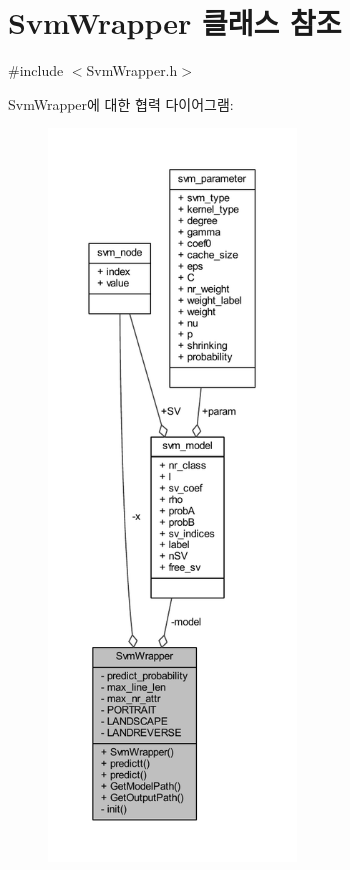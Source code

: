 \hypertarget{class_svm_wrapper}{\section{Svm\+Wrapper 클래스 참조}
\label{class_svm_wrapper}
}


{\ttfamily \#include $<$Svm\+Wrapper.\+h$>$}



Svm\+Wrapper에 대한 협력 다이어그램\+:
\nopagebreak
\begin{figure}[H]
\begin{center}
\leavevmode
\includegraphics[height=550pt]{class_svm_wrapper__coll__graph}
\end{center}
\end{figure}
